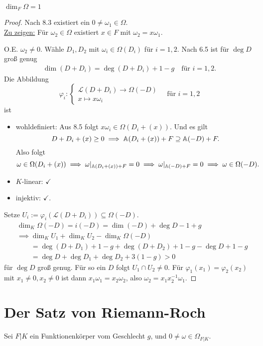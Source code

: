 \begin{satz}
    $\dim_F \Omega=1$
\end{satz}
\begin{proof}
    Nach 8.3 existiert ein $0 \neq \omega_1 \in \Omega$.\\
    \underline{Zu zeigen:} Für $\omega_2 \in \Omega$ existiert $x \in F$ mit $\omega_2 = x\omega_1$.

    O.E. $\omega_2 \ne 0$. Wähle $D_1,D_2$ mit $\omega_i \in \Omega(D_i)$ für $i=1,2$.
    Nach 6.5 ist für $\deg D$ groß genug
    \begin{align*}
        \dim (D+D_i) = \deg (D+D_i) + 1 - g \quad \text{für } i = 1,2.
    \end{align*}
    Die Abbildung
    $$ \varphi_i : \begin{cases}
        \mathcal{L}(D+D_i) \to \Omega(-D)\\
        x \mapsto x\omega_i
    \end{cases} \quad \text{für } i=1,2$$
    ist 
    \begin{itemize}
        \item wohldefiniert: Aus 8.5 folgt $x \omega_i \in \Omega(D_i + (x))$. 
        Und es gilt $$D+D_i + (x) \geq 0 \implies \mathbb{A}(D_i + (x)) + F \supseteq \mathbb{A}(-D) + F.$$
        Also folgt
        $$ \omega \in \Omega(D_i + (x)) \implies \omega|_{\mathbb{A}(D_i + (x)) + F} = 0 \implies \omega|_{\mathbb{A}(-D) + F} = 0 \implies \omega \in \Omega(-D).$$
        \item $K$-linear: $\checkmark$
        \item injektiv: $\checkmark$.
    \end{itemize}
    Setze $U_i := \varphi_i(\mathcal{L}(D+D_i)) \subseteq \Omega(-D)$.
    \begin{align*}
        &\dim_K \Omega(-D) = i(-D) = \dim(-D) + \deg D - 1 + g\\
        &\implies \dim_K U_1 + \dim_K U_2 - \dim_K \Omega(-D)\\
        &\qquad =\deg(D+D_1) + 1 - g + \deg(D+D_2) + 1 -g - \deg D + 1 - g\\
        &\qquad = \deg D + \deg D_1 + \deg D_2 + 3(1-g) > 0
    \end{align*}
    für $\deg D$ groß genug.
    Für so ein $D$ folgt $U_1 \cap U_2 \ne 0$. Für $\varphi_1(x_1) = \varphi_2(x_2)$ mit $x_1\ne 0, x_2 \ne 0$
    ist dann $x_1\omega_1 = x_2 \omega_2$, also $\omega_2 = x_1 x_2^{-1}\omega_1$.
\end{proof}

\section{Der Satz von Riemann-Roch}
Sei $F|K$ ein Funktionenkörper vom Geschlecht $g$, und $0 \ne \omega \in \Omega_{F|K}$.

